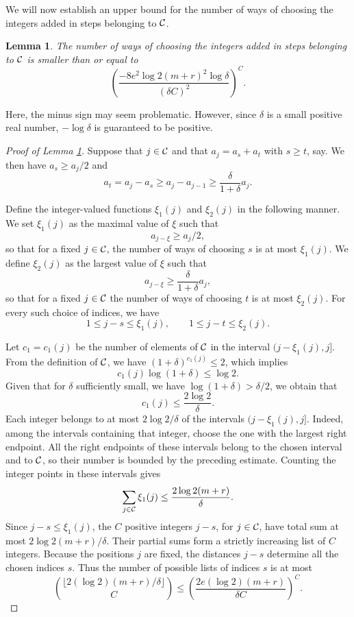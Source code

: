 \documentclass{article}
\newtheorem{lemma}[theorem]{Lemma}
\theoremstyle{definition}
\begin{document}
We will now establish an upper bound for the number of ways of choosing the integers added in steps belonging to ${\cal C}$.

\begin{lemma}\label{ub8}
The number of ways of  choosing the integers added in steps belonging to ${\cal C}$ is smaller than or equal to
$$
\left(\frac{-8e^2\log 2(m+r)^2\log \delta}{(\delta C)^2}\right)^{C}.
$$
\end{lemma}
Here, the minus sign may seem problematic. However, since $\delta$ is a small positive real number, $-\log \delta$ is guaranteed to be positive.
\begin{proof}[Proof of Lemma \ref{ub8}]
Suppose that $j\in {\cal C}$ and that $a_j=a_s+a_t$ with $s\ge t$, say.  We then have $a_s\ge a_j/2$ and $$a_t=a_j-a_s\geq a_j-a_{j-1}\geq \frac{\delta}{1+\delta}a_j.$$ 

Define the integer-valued functions $\xi_1(j)$ and $\xi_2(j)$ in the following manner. We set $\xi_1(j)$ as the maximal value of $\xi$ such that
$$
a_{j-\xi}\ge a_j/2,
$$
so that for a fixed $j\in {\cal C}$, the number of ways of choosing $s$ is at most $\xi_1(j)$.  We define $\xi_2 (j)$ as the largest value of $\xi$ such that
$$
a_{j-\xi}\ge \frac{\delta}{1+\delta}a_j,
$$
so that for a fixed $j\in {\cal C}$ the number of ways of choosing $t$ is at most $\xi_2(j)$. 
For every such choice of indices, we have
$$
1\le j-s\le\xi_1(j),
\qquad
1\le j-t\le\xi_2(j).
$$

Let $c_1=c_1(j)$ be the number of elements of ${\cal C}$ in the  interval $(j-\xi_1(j), j]$.  From the definition of ${\cal C}$, we have $(1+\delta)^{c_1(j)}\le 2$, which implies
$$
c_1(j)\log(1+\delta)\le \log 2.
$$
Given that for $\delta$ sufficiently small, we have $\log(1+\delta)>\delta/2$, we obtain that
$$
c_1(j)\le \frac{2\log 2}{\delta}.
$$
Each integer belongs to at most $2\log 2/\delta$ of the
intervals $(j-\xi_1(j),j]$. Indeed, among the intervals
containing that integer, choose the one with the largest
right endpoint. All the right endpoints of these intervals
belong to the chosen interval and to ${\cal C}$, so their
number is bounded by the preceding estimate.
Counting the integer points in these intervals gives
$$
\sum_{j\in {\cal C}} \xi_1(j) \le \frac{2\log 2(m+r)}{\delta}.
$$
Since $j-s\le\xi_1(j)$, the $C$ positive integers $j-s$,
for $j\in{\cal C}$, have total sum at most
$2\log 2(m+r)/\delta$.
Their partial sums form a strictly increasing list of
$C$ integers. Because the positions $j$ are fixed,
the distances $j-s$ determine all the chosen indices $s$.
Thus the number of possible lists of indices $s$ is at most
\begin{equation}\label{new1}
\binom{\lfloor 2(\log 2)(m+r)/\delta\rfloor}{C}
\le
\left(\frac{2e(\log 2)(m+r)}{\delta C}\right)^C.
\end{equation}


\end{proof}
\end{document}
